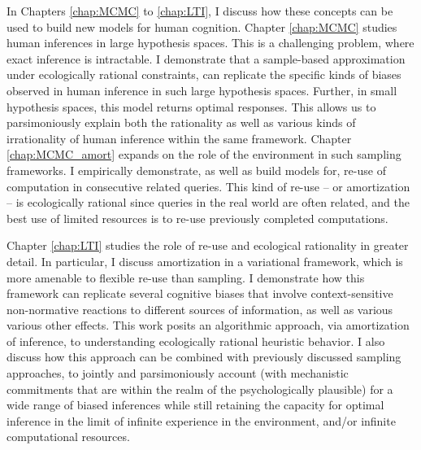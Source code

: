 
In Chapters \ref{chap:MCMC} to \ref{chap:LTI}, I discuss how these concepts can be used to build new models for human cognition. Chapter \ref{chap:MCMC} studies human inferences in large hypothesis spaces. This is a challenging problem, where exact inference is intractable. I demonstrate that a sample-based approximation under ecologically rational constraints, can replicate the specific kinds of biases observed in human inference in such large hypothesis spaces. 
Further, in small hypothesis spaces, this model returns optimal responses. This allows us to parsimoniously explain both the rationality as well as various kinds of irrationality of human inference within the same framework. Chapter \ref{chap:MCMC_amort} expands on the role of the environment in such sampling frameworks. I empirically demonstrate, as well as build models for, re-use of computation in consecutive related queries. This kind of re-use -- or amortization -- is ecologically rational since queries in the real world are often related, and the best use of limited resources is to re-use previously completed computations.

Chapter \ref{chap:LTI} studies the role of re-use and ecological rationality in greater detail. In particular, I discuss amortization in a variational framework, which is more amenable to flexible re-use than sampling. I demonstrate how this framework can replicate several cognitive biases that involve context-sensitive non-normative reactions to different sources of information, 
as well as various various other effects.
This work posits an algorithmic approach, via amortization of inference, to understanding ecologically rational heuristic behavior. I also discuss how this approach can be combined with previously discussed sampling approaches, to jointly and parsimoniously account (with mechanistic commitments that are within the realm of the psychologically plausible) for a wide range of biased inferences while still retaining the capacity for optimal inference in the limit of infinite experience in the environment, and/or infinite computational resources.

